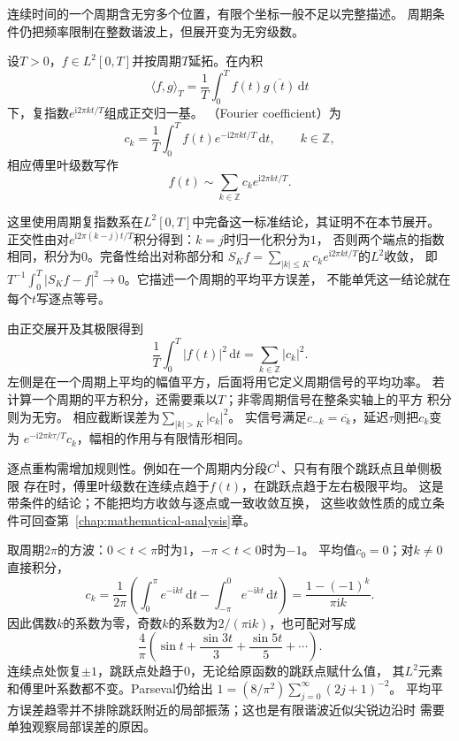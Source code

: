 连续时间的一个周期含无穷多个位置，有限个坐标一般不足以完整描述。
周期条件仍把频率限制在整数谐波上，但展开变为无穷级数。
\begin{definition}[周期信号的傅里叶系数与级数]
  \label{def:signal-analysis-fourier-series}
  设$T>0$，$f\in L^2[0,T]$并按周期$T$延拓。在内积
  \[
    \langle f,g\rangle_T=\frac1T\int_0^T f(t)\overline{g(t)}\,\mathrm dt
  \]
  下，复指数$e^{\mathrm i2\pi kt/T}$组成正交归一基。
  （Fourier coefficient）为
  \[
    c_k=\frac1T\int_0^T f(t)e^{-\mathrm i2\pi kt/T}\,\mathrm dt,
    \qquad k\in\mathbb Z,
  \]
  相应傅里叶级数写作
  \begin{equation}
    f(t)\sim\sum_{k\in\mathbb Z}c_ke^{\mathrm i2\pi kt/T}.
    \label{eq:signal-analysis-fourier-series}
  \end{equation}
\end{definition}
这里使用周期复指数系在$L^2[0,T]$中完备这一标准结论，其证明不在本节展开。
正交性由对$e^{\mathrm i2\pi(k-j)t/T}$积分得到：$k=j$时归一化积分为$1$，
否则两个端点的指数相同，积分为$0$。完备性给出对称部分和
$S_Kf=\sum_{|k|\leq K}c_ke^{\mathrm i2\pi kt/T}$的$L^2$收敛，
即$T^{-1}\int_0^T|S_Kf-f|^2\to0$。它描述一个周期的平均平方误差，
不能单凭这一结论就在每个$t$写逐点等号。

由正交展开及其极限得到
\begin{equation}
  \frac1T\int_0^T|f(t)|^2\,\mathrm dt
  =\sum_{k\in\mathbb Z}|c_k|^2.
  \label{eq:signal-analysis-continuous-parseval}
\end{equation}
左侧是在一个周期上平均的幅值平方，后面将用它定义周期信号的平均功率。
若计算一个周期的平方积分，还需要乘以$T$；非零周期信号在整条实轴上的平方
积分则为无穷。
相应截断误差为$\sum_{|k|>K}|c_k|^2$。
实信号满足$c_{-k}=\overline{c_k}$，延迟$\tau$则把$c_k$变为
$e^{-\mathrm i2\pi k\tau/T}c_k$，幅相的作用与有限情形相同。

逐点重构需增加规则性。例如在一个周期内分段$C^1$、只有有限个跳跃点且单侧极限
存在时，傅里叶级数在连续点趋于$f(t)$，在跳跃点趋于左右极限平均。
这是带条件的结论；不能把均方收敛与逐点或一致收敛互换，
这些收敛性质的成立条件可回查第~\ref{chap:mathematical-analysis}章。

取周期$2\pi$的方波：$0<t<\pi$时为$1$，$-\pi<t<0$时为$-1$。
平均值$c_0=0$；对$k\neq0$直接积分，
\[
  c_k=\frac1{2\pi}\left(
    \int_0^\pi e^{-\mathrm ikt}\,\mathrm dt
    -\int_{-\pi}^0 e^{-\mathrm ikt}\,\mathrm dt\right)
  =\frac{1-(-1)^k}{\pi\mathrm ik}.
\]
因此偶数$k$的系数为零，奇数$k$的系数为$2/(\pi\mathrm ik)$，也可配对写成
\[
  \frac4\pi\left(\sin t+\frac{\sin3t}{3}+\frac{\sin5t}{5}+\cdots\right).
\]
连续点处恢复$\pm1$，跳跃点处趋于$0$，无论给原函数的跳跃点赋什么值，
其$L^2$元素和傅里叶系数都不变。Parseval仍给出
$1=(8/\pi^2)\sum_{j=0}^{\infty}(2j+1)^{-2}$。
平均平方误差趋零并不排除跳跃附近的局部振荡；这也是有限谐波近似尖锐边沿时
需要单独观察局部误差的原因。

